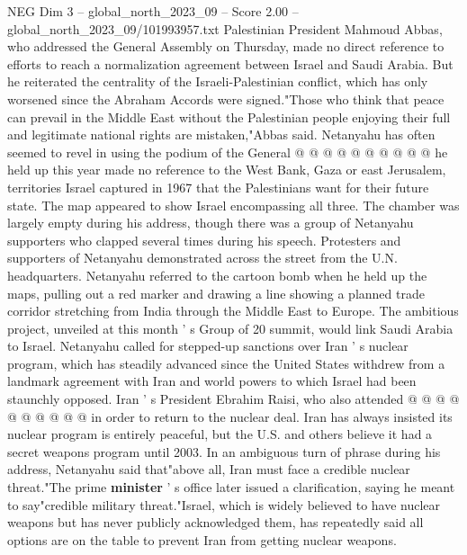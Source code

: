 \begin{textsample}{NEG Dim 3 – global\_north\_2023\_09 – Score 2.00 – global\_north\_2023\_09/101993957.txt}
Palestinian President Mahmoud Abbas, who addressed the General Assembly on Thursday, made no direct reference to efforts to reach a normalization agreement between Israel and Saudi Arabia.
But he reiterated the centrality of the Israeli-Palestinian conflict, which has only worsened since the Abraham Accords were signed."Those who think that peace can prevail in the Middle East without the Palestinian people enjoying their full and legitimate national rights are mistaken,"Abbas said.
Netanyahu has often seemed to revel in using the podium of the General @ @ @ @ @ @ @ @ @ @ he held up this year made no reference to the West Bank, Gaza or east Jerusalem, territories Israel captured in 1967 that the Palestinians want for their future state.
The map appeared to show Israel encompassing all three.
The chamber was largely empty during his address, though there was a group of Netanyahu supporters who clapped several times during his speech.
Protesters and supporters of Netanyahu demonstrated across the street from the U.N. headquarters.
Netanyahu referred to the cartoon bomb when he held up the maps, pulling out a red marker and drawing a line showing a planned trade corridor stretching from India through the Middle East to Europe.
The ambitious project, unveiled at this month ' s Group of 20 summit, would link Saudi Arabia to Israel.
Netanyahu called for stepped-up sanctions over Iran ' s nuclear program, which has steadily advanced since the United States withdrew from a landmark agreement with Iran and world powers to which Israel had been staunchly opposed.
Iran ' s President Ebrahim Raisi, who also attended @ @ @ @ @ @ @ @ @ @ in order to return to the nuclear deal.
Iran has always insisted its nuclear program is entirely peaceful, but the U.S. and others believe it had a secret weapons program until 2003.
In an ambiguous turn of phrase during his address, Netanyahu said that"above all, Iran must face a credible nuclear threat."The prime \textbf{minister} ' s office later issued a clarification, saying he meant to say"credible military threat."Israel, which is widely believed to have nuclear weapons but has never publicly acknowledged them, has repeatedly said all options are on the table to prevent Iran from getting nuclear weapons.

\end{textsample}
